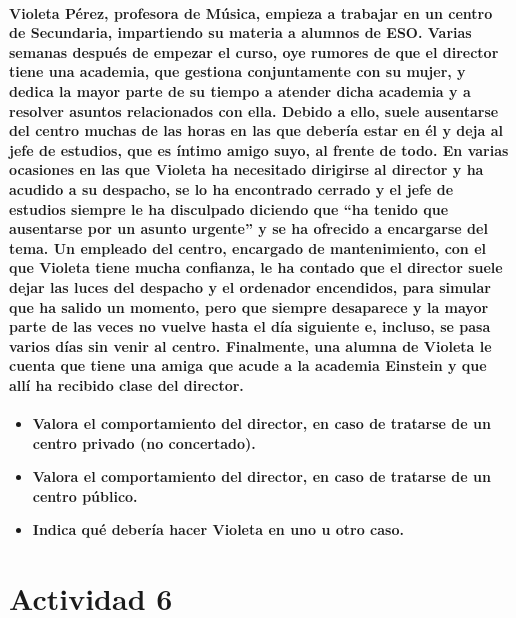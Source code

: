\paragraph{Violeta Pérez, profesora de Música, empieza a trabajar en un centro de Secundaria, impartiendo su materia a
alumnos de ESO. Varias semanas después de empezar el curso, oye rumores de que el director tiene una
academia, que gestiona conjuntamente con su mujer, y dedica la mayor parte de su tiempo a atender dicha
academia y a resolver asuntos relacionados con ella. Debido a ello, suele ausentarse del centro muchas de las
horas en las que debería estar en él y deja al jefe de estudios, que es íntimo amigo suyo, al frente de todo.
En varias ocasiones en las que Violeta ha necesitado dirigirse al director y ha acudido a su despacho, se lo ha
encontrado cerrado y el jefe de estudios siempre le ha disculpado diciendo que “ha tenido que ausentarse por
un asunto urgente” y se ha ofrecido a encargarse del tema.
Un empleado del centro, encargado de mantenimiento, con el que Violeta tiene mucha confianza, le ha
contado que el director suele dejar las luces del despacho y el ordenador encendidos, para simular que ha
salido un momento, pero que siempre desaparece y la mayor parte de las veces no vuelve hasta el día siguiente
e, incluso, se pasa varios días sin venir al centro.
Finalmente, una alumna de Violeta le cuenta que tiene una amiga que acude a la academia Einstein y que allí
ha recibido clase del director.}

\begin{itemize}
\item \textbf{Valora el comportamiento del director, en caso de tratarse de un centro privado (no concertado).}

\item \textbf{Valora el comportamiento del director, en caso de tratarse de un centro público.}

\item \textbf{Indica qué debería hacer Violeta en uno u otro caso.}

\end{itemize}


\section{Actividad 6}

